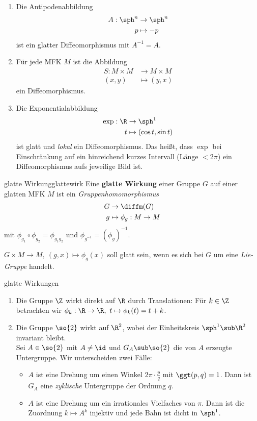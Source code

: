 \begin{beispiele}
\begin{enumerate}
\item Die Antipodenabbildung
\begin{align}
A: \sph^n &\to \sph^n \\
p &\mapsto -p
\end{align}
ist ein glatter Diffeomorphismus mit $A^{-1} = A$.
\item Für jede MFK $M$ ist die Abbildung
\begin{align}
S: M \times M &\to M \times M \\
(x, y) &\mapsto (y, x)
\end{align}
ein Diffeomorphismus.
\item Die Exponentialabbildung
\begin{align}
\exp: \R &\to \sph^1\\
t &\mapsto (\cos t, \sin t)
\end{align}
ist glatt und \textit{lokal} ein Diffeomorphismus. Das heißt, dass $\exp$ bei Einschränkung auf ein hinreichend kurzes Intervall (Länge $<2\pi$) ein Diffeomorphismus aufs jeweilige Bild ist.
\end{enumerate}
\end{beispiele}
\begin{definition}{glatte Wirkung}{glattewirk}
Eine \textbf{glatte Wirkung} einer Gruppe $G$ auf einer glatten MFK $M$ ist ein \textit{Gruppenhomomorphismus}
\begin{align}
G &\to \diffm (G)\\
g &\mapsto \phi_g: M \to M
\end{align}
mit $\phi_{g_1} \circ \phi_{g_2} = \phi_{g_1g_2}$ und $\phi_{g^{-1}}=(\phi_g)^{-1}$.
\end{definition}
$G \times M \to M, \ (g, x) \mapsto \phi_g(x)$ soll glatt sein, wenn es sich bei $G$ um eine \textit{Lie-Gruppe} handelt.
\begin{beispiele}glatte Wirkungen \\
\begin{enumerate}
\item Die Gruppe $\Z$ wirkt direkt auf $\R$ durch Translationen: Für $k \in \Z$ betrachten wir $\phi_k: \R \to \R, \ t \mapsto \phi_k(t)=t+k$.
\item Die Gruppe $\so{2}$ wirkt auf $\R^2$, wobei der Einheitskreis $\sph^1 \sub \R^2$ invariant bleibt.\\
Sei $A \in \so{2}$ mit $A \neq \id$ und $G_A \sub \so{2}$ die von $A$ erzeugte Untergruppe. Wir unterscheiden zwei Fälle:
\begin{itemize}
\item $A$ ist eine Drehung um einen Winkel $2 \pi \cdot \frac{p}{q}$ mit $\ggt (p,q) = 1$. Dann ist $G_A$ eine \textit{zyklische} Untergruppe der Ordnung $q$.
\item $A$ ist eine Drehung um ein irrationales Vielfaches von $\pi$. Dann ist die Zuordnung $k \mapsto A^k$ injektiv und jede Bahn ist dicht in $\sph^1$.
\end{itemize}
\end{enumerate}
\end{beispiele}
